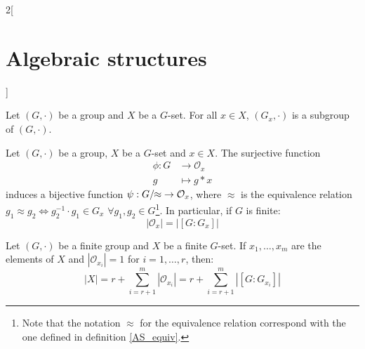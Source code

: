 \documentclass[../../../main.tex]{subfiles}
\begin{document}
\begin{multicols}{2}[\section{Algebraic structures}]
\begin{prop}
    Let $(G,\cdot)$ be a group and $X$ be a $G$-set. For all $x\in X$, $(G_x,\cdot)$ is a subgroup of $(G,\cdot)$.
  \end{prop}
  \begin{theorem}
    Let $(G,\cdot)$ be a group, $X$ be a $G$-set and $x\in X$. The surjective function
    \begin{align*}
      \phi:G & \longrightarrow \mathcal{O}_x \\
      g      & \longmapsto g*x
    \end{align*}
    induces a bijective function $\psi:\quot{G}{\!\!\approx}\;\rightarrow\mathcal{O}_x$, where $\approx$ is the equivalence relation $g_1\approx g_2\iff g_2^{-1}\cdot g_1\in G_x$ $\forall g_1,g_2\in G$\footnote{Note that the notation $\approx$ for the equivalence relation correspond with the one defined in definition \ref{AS_equiv}.}. In particular, if $G$ is finite: $$|\mathcal{O}_x|=|[G:G_x]|$$
  \end{theorem}
  \begin{corollary}
    Let $(G,\cdot)$ be a finite group and $X$ be a finite $G$-set. If $x_1,\ldots,x_m$ are the elements of $X$ and $|\mathcal{O}_{x_i}|=1$ for $i=1,\ldots,r$, then:
    \begin{equation}
      |X|=r+\sum_{i=r+1}^m|\mathcal{O}_{x_i}|=r+\sum_{i=r+1}^m|[G:G_{x_i}]|
      \label{AS-obritsformula}
    \end{equation}
  \end{corollary}

\end{multicols}
\end{document}
